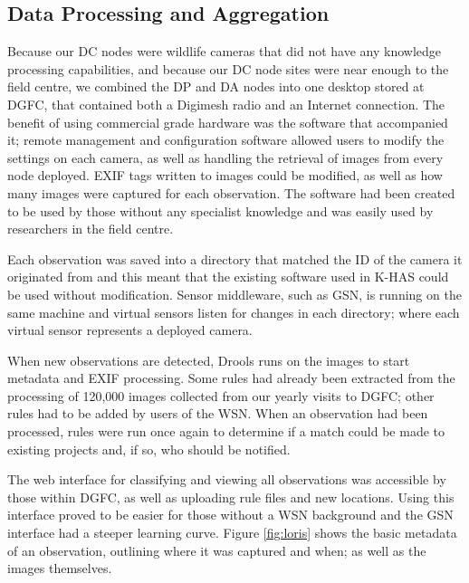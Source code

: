 		\subsection{Data Processing and Aggregation}
				Because our DC nodes were wildlife cameras that did not have any knowledge processing capabilities, and because our DC node sites were near enough to the field centre, we combined the DP and DA nodes into one desktop stored at DGFC, that contained both a Digimesh radio and an Internet connection. The benefit of using commercial grade hardware was the software that accompanied it; remote management and configuration software allowed users to modify the settings on each camera, as well as handling the retrieval of images from every node deployed. EXIF tags written to images could be modified, as well as how many images were captured for each observation. The software had been created to be used by those without any specialist knowledge and was easily used by researchers in the field centre.
				
				Each observation was saved into a directory that matched the ID of the camera it originated from and this meant that the existing software used in K-HAS could be used without modification. Sensor middleware, such as GSN, is running on the same machine and virtual sensors listen for changes in each directory; where each virtual sensor represents a deployed camera.
				
				When new observations are detected, Drools runs on the images to start metadata and EXIF processing. Some rules had already been extracted from the processing of 120,000 images collected from our yearly visits to DGFC; other rules had to be added by users of the WSN. When an observation had been processed, rules were run once again to determine if a match could be made to existing projects and, if so, who should be notified.
				
				The web interface for classifying and viewing all observations was accessible by those within DGFC, as well as uploading rule files and new locations. Using this interface proved to be easier for those without a WSN background and the GSN interface had a steeper learning curve.	Figure \ref{fig:loris} shows the basic metadata of an observation, outlining where it was captured and when; as well as the images themselves.
				
